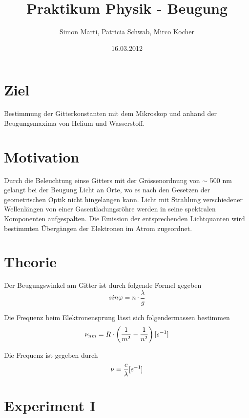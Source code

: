 \documentclass[12pt,a4paper]{article}
\title{Praktikum Physik - Beugung}
\author{Simon Marti, Patricia Schwab, Mirco Kocher}
\date{16.03.2012}
\begin{document}
\maketitle

\section*{Ziel}
Bestimmung der Gitterkonstanten mit dem Mikroskop und anhand der Beugungsmaxima von Helium und Wasserstoff.

\section*{Motivation}
Durch die Beleuchtung einse Gitters mit der Gr\"ossenordnung von $\sim$ 500 nm gelangt bei der Beugung Licht an Orte, wo es nach den Gesetzen der geometrischen Optik nicht hingelangen kann. Licht mit Strahlung verschiedener Wellenl\"angen von einer Gasentladungsr\"ohre werden in seine spektralen Komponenten aufgespalten. Die Emission der entsprechenden Lichtquanten wird bestimmten \"Uberg\"angen der Elektronen im Atrom zugeordnet.


\section*{Theorie}
Der Beugungswinkel am Gitter ist durch folgende Formel gegeben
\begin{equation}\label{eq:g}
sin\varphi = n\cdot \frac{\lambda}{g}
\end{equation}

Die Frequenz beim Elektronensprung l\"asst sich folgendermassen bestimmen
\begin{equation}
\nu_{nm} = R\cdot \left(\frac{1}{m^2}-\frac{1}{n^2}\right) \mbox [{s}^{-1}]
\end{equation}

Die Frequenz ist gegeben durch 
\begin{equation}
\nu = \frac{c}{\lambda} \mbox [{s}^{-1}]
\end{equation}

\section*{Experiment I}

\end{document}
